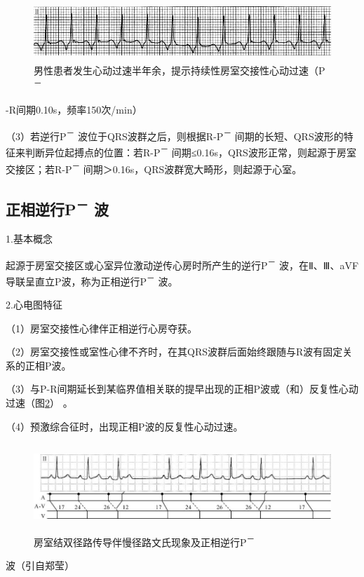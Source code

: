 \begin{figure}[!htbp]
 \centering
 \includegraphics[width=5.30208in,height=0.88542in]{./images/Image00029.jpg}
 \captionsetup{justification=centering}
 \caption{男性患者发生心动过速半年余，提示持续性房室交接性心动过速（P\textsuperscript{－}}
 \label{fig1-23}
  \end{figure} 
-R间期0.10s，频率150次/min）

（3）若逆行P\textsuperscript{－}
波位于QRS波群之后，则根据R-P\textsuperscript{－}
间期的长短、QRS波形的特征来判断异位起搏点的位置：若R-P\textsuperscript{－}
间期≤0.16s，QRS波形正常，则起源于房室交接区；若R-P\textsuperscript{－}
间期＞0.16s，QRS波群宽大畸形，则起源于心室。

\protect\hypertarget{text00007.htmlux5cux23subid21}{}{}

\subsection{正相逆行P\textsuperscript{－} 波}

1.基本概念

起源于房室交接区或心室异位激动逆传心房时所产生的逆行P\textsuperscript{－}
波，在Ⅱ、Ⅲ、aVF导联呈直立P波，称为正相逆行P\textsuperscript{－} 波。

2.心电图特征

（1）房室交接性心律伴正相逆行心房夺获。

（2）房室交接性或室性心律不齐时，在其QRS波群后面始终跟随与R波有固定关系的正相P波。

（3）与P-R间期延长到某临界值相关联的提早出现的正相P波或（和）反复性心动过速（图\ref{fig1-24}）
。

（4）预激综合征时，出现正相P波的反复性心动过速。

\begin{figure}[!htbp]
 \centering
 \includegraphics[width=5.88542in,height=1.28125in]{./images/Image00030.jpg}
 \captionsetup{justification=centering}
 \caption{房室结双径路传导伴慢径路文氏现象及正相逆行P\textsuperscript{－}}
 \label{fig1-24}
  \end{figure} 
波（引自郑莹）

